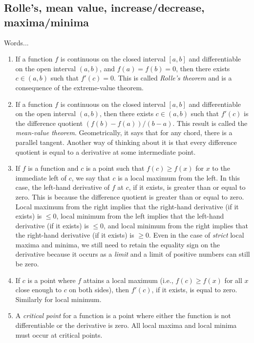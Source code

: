 \documentclass[10pt]{amsart}
\begin{document}
\subsection{Rolle's, mean value, increase/decrease, maxima/minima}

Words...

\begin{enumerate}
\item If a function $f$ is continuous on the closed interval $[a,b]$
  and differentiable on the open interval $(a,b)$, and $f(a) = f(b) =
  0$, then there exists $c \in (a,b)$ such that $f'(c) = 0$. This is
  called {\em Rolle's theorem} and is a consequence of the
  extreme-value theorem.
\item If a function $f$ is continuous on the closed interval $[a,b]$
  and differentiable on the open interval $(a,b)$, then there exists
  $c \in (a,b)$ such that $f'(c)$ is the difference quotient $(f(b) -
  f(a))/(b - a)$. This result is called the {\em mean-value
  theorem}. Geometrically, it says that for any chord, there is a
  parallel tangent. Another way of thinking about it is that every
  difference quotient is equal to a derivative at some intermediate
  point.
\item If $f$ is a function and $c$ is a point such that $f(c) \ge
  f(x)$ for $x$ to the immediate left of $c$, we say that $c$ is a
  local maximum from the left. In this case, the left-hand derivative
  of $f$ at $c$, if it exists, is greater than or equal to zero. This
  is because the difference quotient is greater than or equal to
  zero. Local maximum from the right implies that the right-hand
  derivative (if it exists) is $\le 0$, local minimum from the left
  implies that the left-hand derivative (if it exists) is $\le 0$, and
  local minimum from the right implies that the right-hand derivative
  (if it exists) is $\ge 0$. Even in the case of {\em strict} local
  maxima and minima, we still need to retain the equality sign on the
  derivative because it occurs as a {\em limit} and a limit of
  positive numbers can still be zero.
\item If $c$ is a point where $f$ attains a local maximum (i.e., $f(c)
  \ge f(x)$ for all $x$ close enough to $c$ on both sides), then
  $f'(c)$, if it exists, is equal to zero. Similarly for local
  minimum.
\item A {\em critical point} for a function is a point where either
  the function is not differentiable or the derivative is zero. All
  local maxima and local minima must occur at critical points.

\end{enumerate}
\end{document}
